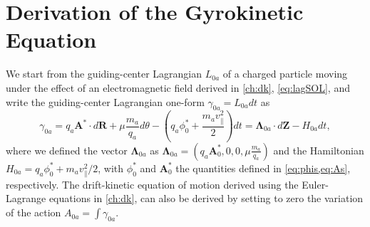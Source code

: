 \section{Derivation of the Gyrokinetic Equation}
\label{sec:gksingpar}

We start from the guiding-center Lagrangian $L_{0a}$ of a charged particle moving under the effect of an electromagnetic field derived in \cref{ch:dk}, \cref{eq:lagSOL}, and write the guiding-center Lagrangian one-form $\gamma_{0a}=L_{0a} dt$ as
%
\begin{equation}
    \gamma_{0a}=q_a \mathbf A^{*} \cdot d \mathbf R+\mu \frac{m_a}{q_a}d \theta-\left(q_a \phi_0^{*}+\frac{m_a v_\parallel^2}{2}\right)dt=\mathbf \Lambda_{0a} \cdot d \mathbf Z-H_{0a} dt,
\label{eq:lagdk}
\end{equation}
%
where we defined the vector $\mathbf \Lambda_{0a}$ as $\mathbf \Lambda_{0a} = \left(q_a \mathbf A_0^{*}, 0, 0, \mu \frac{m_a}{q_a}\right)$ and the Hamiltonian $H_{0a} = q_a \phi_0^{*}+m_a v_\parallel^2/2$, with $\phi_0^{*}$ and $\mathbf A_0^{*}$ the quantities defined in \cref{eq:phis,eq:As}, respectively.
%
%
The drift-kinetic equation of motion derived using the Euler-Lagrange equations in \cref{ch:dk}, can also be derived by setting to zero the variation of the action $A_{0 a} = \int \gamma_{0 a}$.

